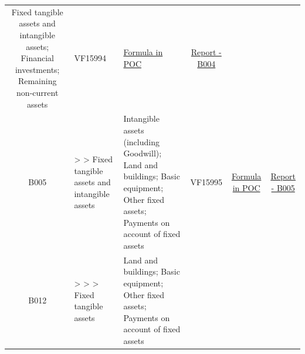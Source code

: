 \documentclass[]{book}
\begin{document}
\begin{longtable}[]{@{}cllccc@{}}
\begin{minipage}[t]{0.16\columnwidth}
Fixed tangible assets and intangible assets; Financial investments; Remaining non-current assets\strut
\end{minipage} & \begin{minipage}[t]{0.09\columnwidth}\centering
VF15994\strut
\end{minipage} & \begin{minipage}[t]{0.15\columnwidth}\centering
\protect\hyperlink{b004---formula-in-poc}{Formula in POC}\strut
\end{minipage} & \begin{minipage}[t]{0.16\columnwidth}\centering
\href{./Auxiliary\%20Files/technical_reports/variable_report/B004(!).pdf}{Report - B004}\strut
\end{minipage}\tabularnewline
\begin{minipage}[t]{0.08\columnwidth}\centering
B005\strut
\end{minipage} & \begin{minipage}[t]{0.20\columnwidth}\raggedright
\textgreater{} \textgreater{} Fixed tangible assets and intangible assets\strut
\end{minipage} & \begin{minipage}[t]{0.16\columnwidth}\raggedright
Intangible assets (including Goodwill); Land and buildings; Basic equipment; Other fixed assets; Payments on account of fixed assets\strut
\end{minipage} & \begin{minipage}[t]{0.09\columnwidth}\centering
VF15995\strut
\end{minipage} & \begin{minipage}[t]{0.15\columnwidth}\centering
\protect\hyperlink{b005---formula-in-poc}{Formula in POC}\strut
\end{minipage} & \begin{minipage}[t]{0.16\columnwidth}\centering
\href{./Auxiliary\%20Files/technical_reports/variable_report/B005.pdf}{Report - B005}\strut
\end{minipage}\tabularnewline
\begin{minipage}[t]{0.08\columnwidth}\centering
B012\strut
\end{minipage} & \begin{minipage}[t]{0.20\columnwidth}\raggedright
\textgreater{} \textgreater{} \textgreater{} Fixed tangible assets\strut
\end{minipage} & \begin{minipage}[t]{0.16\columnwidth}\raggedright
Land and buildings; Basic equipment; Other fixed assets; Payments on account of fixed assets \footnotemark{}\strut

\end{minipage}
\end{longtable}
\end{document}

